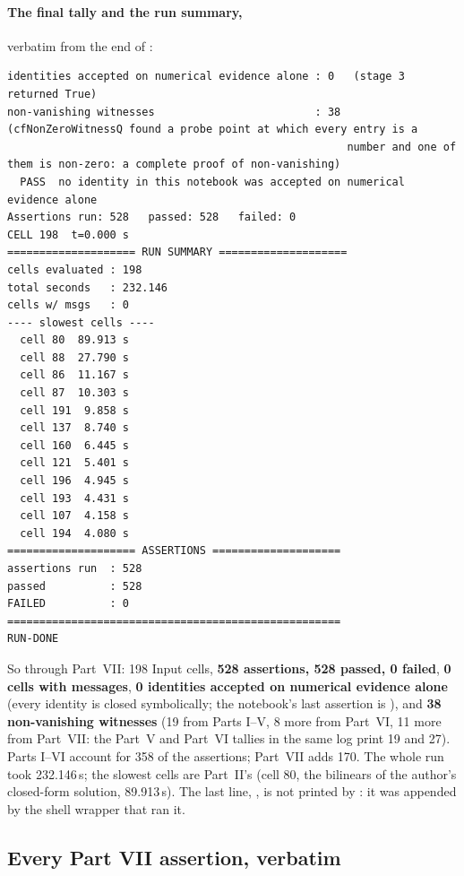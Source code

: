 \paragraph{The final tally and the run summary,} verbatim from the end of
:

\begin{Verbatim}[fontsize=\scriptsize]
identities accepted on numerical evidence alone : 0   (stage 3 returned True)
non-vanishing witnesses                         : 38   (cfNonZeroWitnessQ found a probe point at which every entry is a
                                                     number and one of them is non-zero: a complete proof of non-vanishing)
  PASS  no identity in this notebook was accepted on numerical evidence alone
Assertions run: 528   passed: 528   failed: 0
CELL 198  t=0.000 s
==================== RUN SUMMARY ====================
cells evaluated : 198
total seconds   : 232.146
cells w/ msgs   : 0
---- slowest cells ----
  cell 80  89.913 s
  cell 88  27.790 s
  cell 86  11.167 s
  cell 87  10.303 s
  cell 191  9.858 s
  cell 137  8.740 s
  cell 160  6.445 s
  cell 121  5.401 s
  cell 196  4.945 s
  cell 193  4.431 s
  cell 107  4.158 s
  cell 194  4.080 s
==================== ASSERTIONS ====================
assertions run  : 528
passed          : 528
FAILED          : 0
====================================================
RUN-DONE

\end{Verbatim}

So through Part~VII: 198 Input cells, \textbf{528 assertions, 528 passed, 0 failed}, \textbf{0 cells
with messages}, \textbf{0 identities accepted on numerical evidence alone} (every identity is closed
symbolically; the notebook's last assertion is ), and \textbf{38
non-vanishing witnesses} (19 from Parts I--V, 8 more from Part~VI, 11 more from Part~VII: the Part~V
and Part~VI tallies in the same log print 19 and 27). Parts I--VI account for 358 of the assertions;
Part~VII adds 170. The whole run took 232.146\,s; the slowest cells are Part~II's (cell 80, the
bilinears of the author's closed-form solution, 89.913\,s). The last line, , is not
printed by : it was appended by the shell wrapper that ran it.

\subsection{Every Part VII assertion, verbatim}
\label{sec:10.2}

